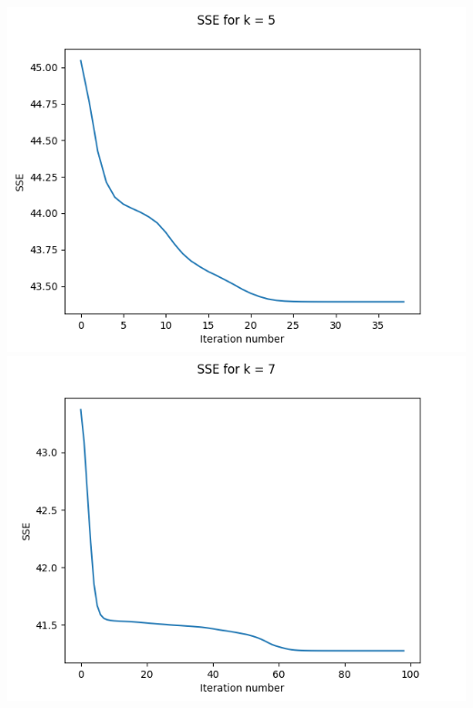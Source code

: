 \documentclass{article}
\begin{document}
\begin{center}
    \includegraphics[scale=0.4]{images/task1_5_graph_5.png}
    \includegraphics[scale=0.4]{images/task1_5_graph_7.png}
\end{center}
\vspace{0.2cm}
\end{document}
